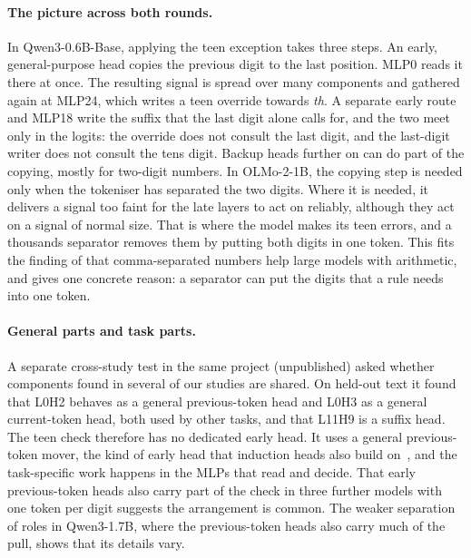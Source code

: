 \documentclass[11pt]{article}
\newcommand{\qw}{Qwen3-0.6B-Base}
\newcommand{\ol}{OLMo-2-1B}
\newcommand{\mlp}[1]{MLP#1}
\newcommand{\hd}[2]{L#1H#2}
\newcommand{\sfx}[1]{\textit{#1}}
\begin{document}
\paragraph{The picture across both rounds.} In \qw{}, applying the teen exception takes three steps. An early, general-purpose head copies the previous digit to the last position. \mlp{0} reads it there at once. The resulting signal is spread over many components and gathered again at \mlp{24}, which writes a teen override towards \sfx{th}. A separate early route and \mlp{18} write the suffix that the last digit alone calls for, and the two meet only in the logits: the override does not consult the last digit, and the last-digit writer does not consult the tens digit. Backup heads further on can do part of the copying, mostly for two-digit numbers. In \ol{}, the copying step is needed only when the tokeniser has separated the two digits. Where it is needed, it delivers a signal too faint for the late layers to act on reliably, although they act on a signal of normal size. That is where the model makes its teen errors, and a thousands separator removes them by putting both digits in one token. This fits the finding of \citet{singh2024tokenization} that comma-separated numbers help large models with arithmetic, and gives one concrete reason: a separator can put the digits that a rule needs into one token.

\paragraph{General parts and task parts.} A separate cross-study test in the same project (unpublished) asked whether components found in several of our studies are shared. On held-out text it found that \hd{0}{2} behaves as a general previous-token head and \hd{0}{3} as a general current-token head, both used by other tasks, and that \hd{11}{9} is a suffix head. The teen check therefore has no dedicated early head. It uses a general previous-token mover, the kind of early head that induction heads also build on~\citep{olsson2022induction}, and the task-specific work happens in the MLPs that read and decide. That early previous-token heads also carry part of the check in three further models with one token per digit suggests the arrangement is common. The weaker separation of roles in Qwen3-1.7B, where the previous-token heads also carry much of the pull, shows that its details vary.
\end{document}
